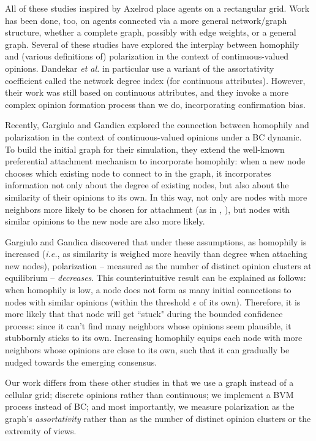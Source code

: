 All of these studies inspired by Axelrod place agents on a rectangular grid.
Work has been done, too, on agents connected via a more general network/graph
structure, whether a complete graph, possibly with edge
weights\cite{deffuant_how_2002,degroot_reaching_1974}, or a general
graph\cite{dandekar_biased_2013}. Several of these studies have explored the
interplay between homophily and (various definitions of) polarization in the
context of continuous-valued opinions. Dandekar \textit{et
al.}\cite{dandekar_biased_2013} in particular use a variant of the
assortativity coefficient called the network degree index (for continuous
attributes). However, their work was still based on continuous attributes, and
they invoke a more complex opinion formation process than we do, incorporating
confirmation bias.

Recently, Gargiulo and Gandica\cite{gargiulo_role_2017} explored the
connection between homophily and polarization in the context of
continuous-valued opinions under a BC dynamic. To build the initial graph for
their simulation, they extend the well-known preferential attachment mechanism
\cite{barabasi_emergence_1999} to incorporate homophily: when a new node
chooses which existing node to connect to in the graph, it incorporates
information not only about the degree of existing nodes, but also about
the similarity of their opinions to its own. In this way, not only are
nodes with more neighbors more likely to be chosen for attachment (as in
\cite{barabasi_emergence_1999}, \cite{deffuant_mixing_2000}), but nodes with
similar opinions to the new node are also more likely. 

Gargiulo and Gandica discovered that under these assumptions, as homophily is
increased (\textit{i.e.}, as similarity is weighed more heavily than degree
when attaching new nodes), polarization -- measured as the number of distinct
opinion clusters at equilibrium -- \textit{decreases}. This counterintuitive
result can be explained as follows: when homophily is low, a node does not
form as many initial connections to nodes with similar opinions (within the
threshold $\epsilon$ of its own). Therefore, it is more likely that that node
will get ``stuck" during the bounded confidence process: since it can't find
many neighbors whose opinions seem plausible, it stubbornly sticks to its own.
Increasing homophily equips each node with more neighbors whose opinions are
close to its own, such that it can gradually be nudged towards the emerging
consensus.

Our work differs from these other studies in that we use a graph instead of a
cellular grid; discrete opinions rather than continuous; we implement a BVM
process instead of BC; and most importantly, we measure polarization as the
graph's \textit{assortativity} rather than as the number of distinct opinion
clusters or the extremity of views.
